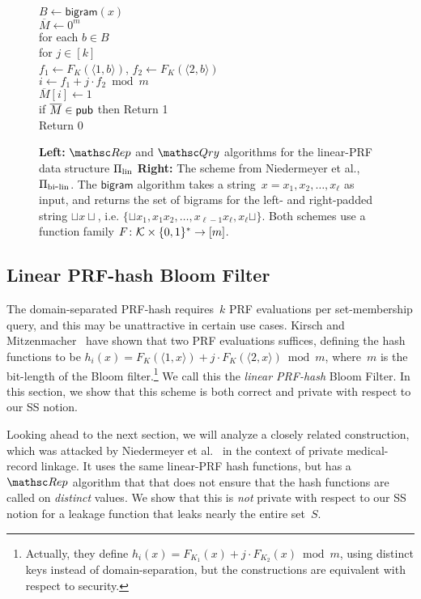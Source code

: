 \begin{figure}[tp]
{\medskip
{}\\
$B \gets \mathsf{bigram}(x)$\\
$\overline{M} \gets 0^m$\\
for each $b \in B$\\
\nudge for $j \in [k]$\\
\nudge\nudge $f_1 \gets F_{K}(\langle 1,b \rangle)$, $f_2 \gets F_{K}(\langle 2,b \rangle)$\\
\nudge\nudge $i \gets f_1+j\cdot f_2 \bmod m$\\
\nudge\nudge $\overline{M}[i] \gets 1$\\
if $\overline{M} \in {\sf pub}$ then Return 1 \\
Return 0
}
\caption{{\bf Left:} $\Rep$ and $\Qry$ algorithms for the linear-PRF
  data structure $\Pi_{\mathrm{lin}}$ {\bf Right:}
The scheme from Niedermeyer et al.\cite{niedermeyer2014cryptanalysis}, $\Pi_{\mathrm{bi}\mbox{-}\mathrm{lin}}$.
The $\mathsf{bigram}$ algorithm takes a
string~$x=x_1,x_2,\ldots,x_\ell$ as input, and returns the set of
bigrams for the left- and right-padded string $\sqcup x \sqcup$,
i.e. $\{\sqcup x_1, x_1x_2,\ldots,x_{\ell-1}x_\ell,x_\ell\sqcup\}$.
Both schemes use a function family $F\colon {\cal K} \times \{0,1\}^* \to [m]$.
}\label{fig:lin-and-bi-lin}
\label{fig:niedermeyer}
\end{figure}

\subsection{Linear PRF-hash Bloom Filter }
The domain-separated PRF-hash requires~$k$ PRF evaluations per set-membership query, and this may be unattractive in certain use cases.  Kirsch and Mitzenmacher~\cite{kirsch2006less} have shown that two PRF evaluations suffices, defining the hash functions to be $h_i(x)=F_K(\langle 1,x \rangle) + j\cdot F_K(\langle 2,x \rangle) \bmod m$, where~$m$ is the bit-length of the Bloom filter.\footnote{Actually, they define $h_i(x)=F_{K_1}(x)  + j\cdot F_{K_2}(x) \bmod m$, using distinct keys instead of domain-separation, but the constructions are equivalent with respect to security.} We call this the \emph{linear PRF-hash} Bloom Filter.  In this section, we show that this scheme is both correct and private with respect to our SS notion.

Looking ahead to the next section, we will analyze a closely related
construction, which was attacked by Niedermeyer et
al.~\cite{niedermeyer2014cryptanalysis} in the context of private
medical-record linkage.  It uses the same linear-PRF hash functions,
but has a $\Rep$ algorithm that that does not ensure that the hash
functions are called on \emph{distinct} values.  We show that this is
\emph{not} private with respect to our SS notion for a leakage
function that leaks nearly the entire set~$S$.

